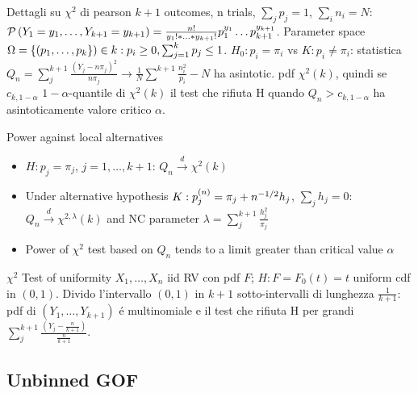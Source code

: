 \documentclass[asd-beamer.tex]{subfiles}
\begin{document}
\begin{wordonframe}{Dettagli su $\chi^2$ di pearson}
$k+1$ outcomes, n trials, $\sum_jp_j=1$, $\sum_in_i=N$: $\operatorname{\mathcal{P}}{(Y_1=y_1,\ldots,Y_{k+1}=y_{k+1})}=\frac{n!}{y_1!*\ldots*y_{k+1}!}p_1^{y_1}\ldots p_{k+1}^{y_{k+1}}$. Parameter space $\Omega=\{(p_1,\ldots,p_k\})\in \real{k}: p_i\geq0,\sum_{j=1}^kp_j\leq1$.
$H_0: p_i=\pi_i$ vs $K: p_i\neq\pi_i$:
statistica $Q_n=\sum_j^{k+1}\frac{(Y_j-n\pi_j)^2}{n\pi_j}\to\frac{1}{N}\sum^{k+1}\frac{n_i^2}{p_i}-N$ ha asintotic. pdf $\chi^2(k)$, quindi se $c_{k,1-\alpha}$ $1-\alpha$-quantile di $\chi^2(k)$ il test che rifiuta H quando $Q_n>c_{k,1-\alpha}$ ha asintoticamente valore critico $\alpha$.
\begin{block}{Power against local alternatives}
	\begin{itemize}
		\item $H: p_j=\pi_j$, $j=1,\ldots,k+1$: $Q_n\xrightarrow{d}\chi^2(k)$
		\item Under alternative hypothesis $K: p_j^{(n)}=\pi_j+n^{-1/2}h_j$, $\sum_jh_j=0$: $Q_n\xrightarrow{d}\chi^{2,\lambda}(k)$ and NC parameter $\lambda=\sum_j^{k+1}\frac{h_j^2}{\pi_j}$
		\item Power of $\chi^2$ test based on $Q_n$ tends to a limit greater than critical value $\alpha$
	\end{itemize}
\end{block}
\end{wordonframe}

\begin{frame}{$\chi^2$ Test of uniformity}
$X_1,\ldots,X_n$ iid RV con pdf $F$; $H: F=F_0(t)=t$ uniform cdf in $(0,1)$. Divido l'intervallo $(0,1)$ in $k+1$ sotto-intervalli di lunghezza $\frac{1}{k+1}$: pdf di $(Y_1,\ldots,Y_{k+1})$ \'e multinomiale e il test che rifiuta H per grandi $\sum_j^{k+1}\frac{(Y_j-\frac{n}{k+1})}{\frac{n}{k+1}}$.
\end{frame}

\subsection{Unbinned GOF}
\end{document}
